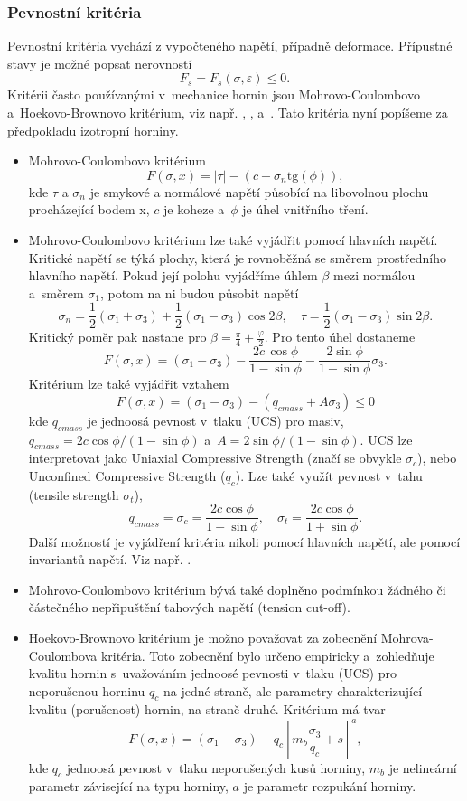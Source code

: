 \documentclass{article}
\begin{document}
\subsubsection{Pevnostní kritéria}
Pevnostní kritéria vychází z vypočteného napětí, případně deformace. Přípustné stavy je možné popsat nerovností
$$
	F_s = F_s(\sigma, \varepsilon) \leq 0.
$$
Kritérii často používanými v~mechanice hornin jsou Mohrovo-Coulombovo a~Hoekovo-Brownovo kritérium, viz např. 
\cite{Desai1984}, \cite{Goel2011}, \cite{Zang2010} a~\cite{Brady2006}. Tato kritéria nyní popíšeme za předpokladu izotropní horniny.
\begin{itemize}
	\item Mohrovo-Coulombovo kritérium
		$$
			F (\sigma, x) = |\tau| - (c + \sigma_n \mbox{tg} (\phi)) ,
		$$
		kde $\tau$ a $\sigma_n$ je smykové a normálové napětí působící na libovolnou plochu procházející bodem x, $c$ je koheze a~$\phi$ je úhel vnitřního tření.
	\item Mohrovo-Coulombovo kritérium lze také vyjádřit pomocí hlavních napětí. Kritické napětí se týká plochy, která je rovnoběžná se směrem prostředního hlavního napětí. Pokud její polohu vyjádříme úhlem $\beta$ mezi normálou a~směrem $\sigma_1$, potom na ni budou působit napětí
		$$
			\sigma_n = \frac{1}{2}(\sigma_1 + \sigma_3 ) + \frac{1}{2}(\sigma_1 - \sigma_3 )\cos 2 \beta, \quad \tau = \frac{1}{2}(\sigma_1 - \sigma_3 ) \sin 2 \beta.
		$$
		Kritický poměr pak nastane pro $\beta =  \frac{\pi}{4} + \frac{\varphi}{2}$. Pro tento úhel dostaneme
		$$
			F(\sigma,x) = (\sigma_1 - \sigma_3 ) - \frac{2c\,\cos \phi}{1-\sin \phi} - \frac{2\sin \phi}{1-\sin \phi} \sigma_3 .
		$$
		Kritérium lze také vyjádřit vztahem
		$$
			F(\sigma, x) = (\sigma_1 - \sigma_3) - (q_{cmass} + A\sigma_3) \leq 0
		$$
		kde $q_{cmass}$ je jednoosá pevnost v~tlaku (UCS) pro masiv, $q_{cmass} = 2c \cos \phi / (1-\sin \phi)$ a~$A = 2 \sin \phi / (1-\sin \phi)$. UCS lze interpretovat jako Uniaxial Compressive Strength (značí se obvykle $\sigma_c$), nebo Unconfined Compressive Strength ($q_c$). Lze také využít pevnost v~tahu (tensile strength $\sigma_t$),
		$$
			q_{cmass} = \sigma_c = \frac{2c \cos \phi}{1-\sin \phi}, \quad \sigma_t = \frac{2c \cos \phi}{1+ \sin \phi}.
		$$
		Další možností je vyjádření kritéria nikoli pomocí hlavních napětí, ale pomocí invariantů napětí. Viz např. \cite{Desai1984}.
	\item Mohrovo-Coulombovo kritérium bývá také doplněno podmínkou žádného či částečného nepřipuštění tahových napětí (tension cut-off).
	\item Hoekovo-Brownovo kritérium je možno považovat za zobecnění Mohrova-Coulombova kritéria. Toto zobecnění bylo určeno empiricky a~zohledňuje kvalitu hornin s~uvažováním jednoosé pevnosti v~tlaku (UCS) pro neporušenou horninu $q_c$ na jedné straně, ale parametry charakterizující kvalitu (porušenost) hornin, na straně druhé. 					Kritérium má tvar
		$$
			F(\sigma,x)=(\sigma_1 - \sigma_3 ) - q_c \left[m_b \frac{\sigma_3}{q_c} + s \right]^a ,
		$$
		kde $q_{c}$ jednoosá pevnost v~tlaku neporušených kusů horniny, $m_b$ je nelineární parametr závisející na typu horniny, $a$ je parametr rozpukání horniny.
\end{itemize}
\end{document}
